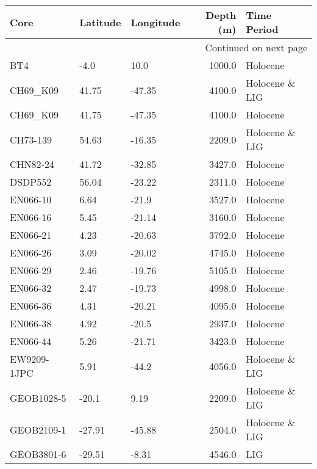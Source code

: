 \begin{longtable}{lllrl}

             Core & Latitude & Longitude &  Depth (m) &     Time Period \\

\endhead

\multicolumn{5}{r}{{Continued on next page}} \\

\endfoot


\endlastfoot
              BT4 &     -4.0 &      10.0 &     1000.0 &        Holocene \\
         CH69\_K09 &    41.75 &    -47.35 &     4100.0 &  Holocene \& LIG \\
         CH69\_K09 &    41.75 &    -47.35 &     4100.0 &        Holocene \\
         CH73-139 &    54.63 &    -16.35 &     2209.0 &  Holocene \& LIG \\
         CHN82-24 &    41.72 &    -32.85 &     3427.0 &        Holocene \\
          DSDP552 &    56.04 &    -23.22 &     2311.0 &        Holocene \\
         EN066-10 &     6.64 &     -21.9 &     3527.0 &        Holocene \\
         EN066-16 &     5.45 &    -21.14 &     3160.0 &        Holocene \\
         EN066-21 &     4.23 &    -20.63 &     3792.0 &        Holocene \\
         EN066-26 &     3.09 &    -20.02 &     4745.0 &        Holocene \\
         EN066-29 &     2.46 &    -19.76 &     5105.0 &        Holocene \\
         EN066-32 &     2.47 &    -19.73 &     4998.0 &        Holocene \\
         EN066-36 &     4.31 &    -20.21 &     4095.0 &        Holocene \\
         EN066-38 &     4.92 &     -20.5 &     2937.0 &        Holocene \\
         EN066-44 &     5.26 &    -21.71 &     3423.0 &        Holocene \\
      EW9209-1JPC &     5.91 &     -44.2 &     4056.0 &  Holocene \& LIG \\
       GEOB1028-5 &    -20.1 &      9.19 &     2209.0 &  Holocene \& LIG \\
       GEOB2109-1 &   -27.91 &    -45.88 &     2504.0 &  Holocene \& LIG \\
       GEOB3801-6 &   -29.51 &     -8.31 &     4546.0 &             LIG \\

\end{longtable}
